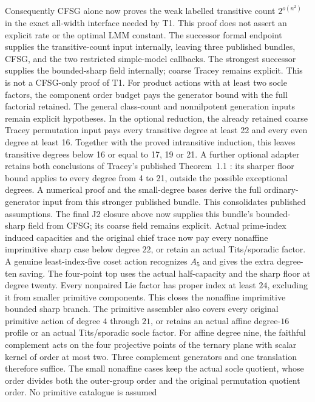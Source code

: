 Consequently CFSG alone now proves the weak labelled transitive count
$2^{o(n^2)}$ in the exact all-width interface needed by T1. This proof
does not assert an explicit rate or the optimal LMM constant. The
successor formal endpoint supplies the transitive-count input internally,
leaving three published bundles, CFSG, and the two restricted simple-model
callbacks. The strongest successor supplies the bounded-sharp field
internally; coarse Tracey remains explicit. This is not a CFSG-only proof of T1.
For product actions with at least two
socle factors, the component order budget pays the generator bound with
the full factorial retained. The general class-count and nonnilpotent
generation inputs remain explicit hypotheses. In the optional reduction,
the already retained coarse Tracey permutation input pays every
transitive degree at least 22 and every even degree at least 16.
Together with the proved intransitive induction, this leaves transitive
degrees below 16 or equal to 17, 19 or 21. A further optional adapter
retains both conclusions of Tracey's published Theorem~1.1
\cite{Tracey2018}: its sharper floor bound applies to every degree from
4 to 21, outside the possible exceptional degrees. A numerical proof
and the small-degree bases derive the full ordinary-generator input
from this stronger published bundle. This consolidates published
assumptions. The final J2 closure above now supplies this bundle's
bounded-sharp field from CFSG; its coarse field remains explicit.
Actual prime-index induced capacities and the original chief trace now
pay every nonaffine imprimitive sharp case below degree $22$, or retain
an actual Tits/sporadic factor. A genuine least-index-five coset action
recognizes $A_5$ and gives the extra degree-ten saving. The four-point
top uses the actual half-capacity and the sharp floor at degree twenty.
Every nonpaired Lie factor has proper index at least $24$, excluding
it from smaller primitive components. This closes the nonaffine
imprimitive bounded sharp branch. The primitive assembler also covers
every original primitive action of degree $4$ through $21$, or retains
an actual affine degree-$16$ profile or an actual Tits/sporadic socle
factor. For affine degree nine, the faithful complement acts on the
four projective points of the ternary plane with scalar kernel of
order at most two. Three complement generators and one translation
therefore suffice. The small nonaffine cases keep the actual socle
quotient, whose order divides both the outer-group order and the
original permutation quotient order. No primitive catalogue is assumed
